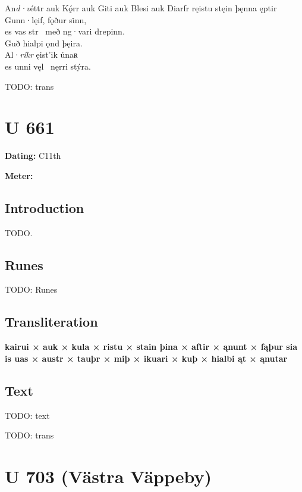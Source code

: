 \bpg\bpa[0]%
\startsub An\emph{d·v}éttr auk Kǫ́rr auk Giti auk Blesi auk Diarfr ręistu stęin þęnna ęptir Gunn·lęif, fǫður si̇nn,\endsub \\
es vas str \hld\ með ng·vari drepinn. \\
Guð hialpi ǫnd þęira. \\
Al·\emph{ríkr} ęist’ik u̇naʀ \\
es unni vęl \hld\ nęrri stýra.\epa

\bpb TODO: trans\epb\epg

\sectionline\clearpage


\section{U 661}

\begin{flushright}%
\textbf{Dating:} C11th

\textbf{Meter:} \Fornyrdislag
\end{flushright}%

\subsection{Introduction}

TODO.

\subsection{Runes}

TODO: Runes%

\subsection{Transliteration}

\textbf{kairui × auk × kula × ristu × stain þina × aftir × ąnunt × fąþur sia is uas × austr × tauþr × miþ × ikuari × kuþ × hialbi ąt × ąnutar}

\subsection{Text}

\bpg\bpa[0]%
TODO: text\epa

\bpb TODO: trans\epb\epg

\sectionline\clearpage


\section{U 703 (Västra Väppeby)}

